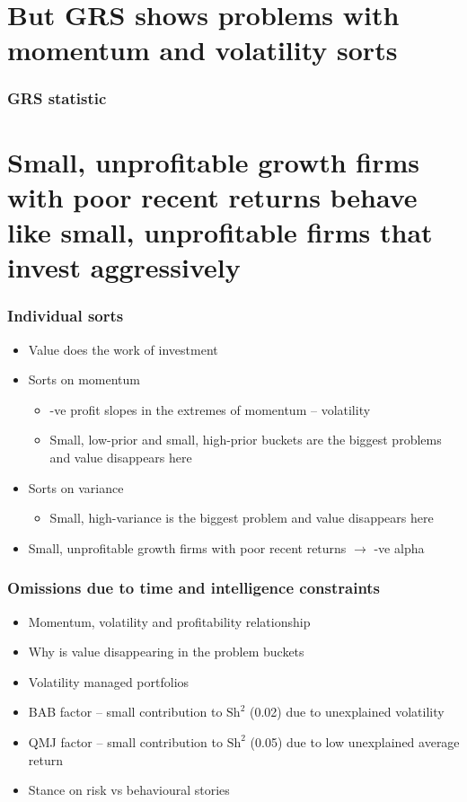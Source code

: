 \documentclass{beamer}
\begin{document}
\section{But GRS shows problems with momentum and volatility sorts}
\begin{frame}
\frametitle{GRS statistic}
\begin{center}
\resizebox*{!}{\dimexpr\textheight-1.3cm\relax}{
    
    }
\end{center}
\end{frame}

\section{Small, unprofitable growth firms with poor recent returns
behave like small, unprofitable firms that invest aggressively}
\begin{frame}
\frametitle{Individual sorts}
\begin{itemize}
    \item Value does the work of investment
    \item Sorts on momentum
    \begin{itemize}
        \item -ve profit slopes in the extremes of momentum -- volatility
        \item Small, low-prior and small, high-prior buckets are the biggest
        problems and value disappears here
    \end{itemize}
    \item Sorts on variance
    \begin{itemize}
        \item Small, high-variance is the biggest problem and value disappears
        here
    \end{itemize}
    \item Small, unprofitable growth firms with poor recent returns
    $\rightarrow$ -ve alpha
\end{itemize}
\end{frame}

\begin{frame}
\frametitle{Omissions due to time and intelligence constraints}
\begin{itemize}
    \item Momentum, volatility and profitability relationship
    \item Why is value disappearing in the problem buckets
    \item Volatility managed portfolios
    \item BAB factor -- small contribution to $\text{Sh}^2$ (0.02) due to
    unexplained volatility
    \item QMJ factor -- small contribution to $\text{Sh}^2$ (0.05) due to low
    unexplained average return
    \item Stance on risk vs behavioural stories
\end{itemize}
\end{frame}
\end{document}
